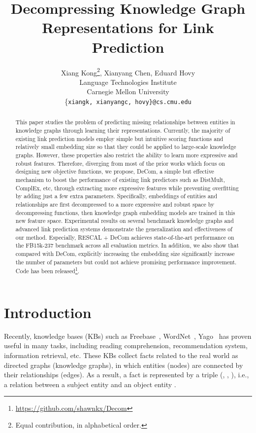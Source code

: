 \documentclass[letterpaper]{article} \usepackage{aaai20}  \usepackage{times}  \usepackage{helvet} \usepackage{courier}  \usepackage{booktabs}
\title{Decompressing Knowledge Graph Representations for Link Prediction}
\author{Xiang Kong\thanks{Equal contribution, in alphabetical order.}, Xianyang Chen\footnotemark[1], Eduard Hovy\\
  Language Technologies Institute\\
  Carnegie Mellon University\\
  \{\tt  xiangk, xianyangc, hovy\}@cs.cmu.edu}
\begin{document}
\maketitle

\begin{abstract}
This paper studies the problem of predicting missing relationships between entities in knowledge graphs through learning their representations. Currently, the majority of existing link prediction models employ simple but intuitive scoring functions and relatively small embedding size so that they could be applied to large-scale knowledge graphs. However, these properties also restrict the ability to learn more expressive and robust features. Therefore, diverging from most of the prior works which focus on designing new objective functions, we propose, DeCom, a simple but effective mechanism to boost the performance of existing link predictors such as DistMult, ComplEx, etc, through extracting more expressive features while preventing overfitting by adding just a few extra parameters.
Specifically, embeddings of entities and relationships are first decompressed to a more expressive and robust space by decompressing functions, then knowledge graph embedding models are trained in this new feature space. Experimental results on several benchmark knowledge graphs and advanced link prediction systems demonstrate the generalization and effectiveness of our method. Especially, RESCAL + DeCom achieves state-of-the-art performance on the FB15k-237 benchmark across all evaluation metrics.
In addition, we also show that compared with DeCom, explicitly increasing the embedding size significantly increase the number of parameters but could not achieve promising performance improvement. Code has been released\footnote{\url{https://github.com/shawnkx/Decom}}.
\end{abstract}



\section{Introduction}
Recently, knowledge bases (KBs) such as Freebase~\cite{bollacker2008freebase}, WordNet~\cite{miller1995wordnet}, Yago~\cite{suchanek2007yago} has proven useful in many tasks, including reading comprehension, recommendation system, information retrieval, etc. These KBs collect facts related to the real world as directed graphs (knowledge graphs), in which entities (nodes) are connected by their relationships (edges). As a result, a fact is represented by a triple (, , ), i.e., a relation  between a subject entity  and an object entity . 
\end{document}
